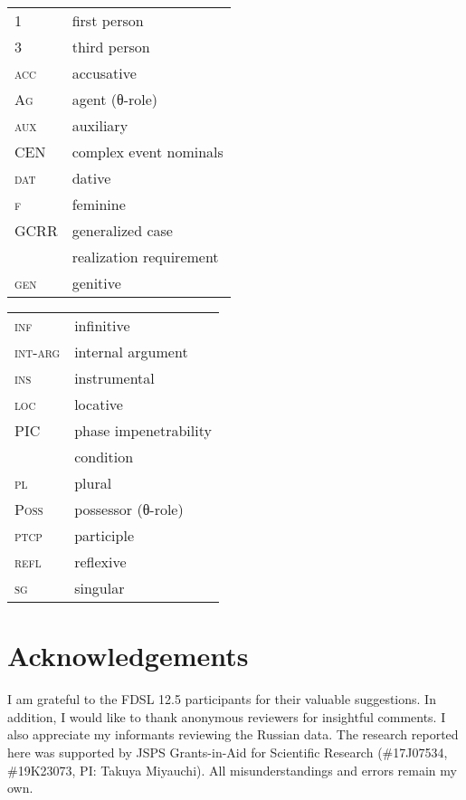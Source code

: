 \documentclass[output=paper,
]{langscibook}
\begin{document}
\begin{tabularx}{.5\textwidth}{lX}
1 & first person \\ 
3 & third person\\
\textsc{acc} & accusative \\ 
\textsc{Ag} & agent (θ-role) \\ 
\textsc{aux} & auxiliary \\ 
CEN & complex event nominals \\
\textsc{dat} & dative \\ 
\textsc{f} & feminine \\ 
GCRR & generalized case \\
 &realization requirement \\
\textsc{gen} & genitive  \\ 
\end{tabularx}
\begin{tabularx}{.45\textwidth}{lX}
\textsc{inf} & infinitive \\ 
\textsc{int-arg} & internal argument \\ 
\textsc{ins} & instrumental \\ 
\textsc{loc} & locative  \\ 
PIC & phase impenetrability\\
&condition \\
\textsc{pl} & plural \\ 
\textsc{Poss} & possessor (θ-role) \\ 
\textsc{ptcp} & participle \\ 
\textsc{refl}&reflexive \\ 
\textsc{sg} & singular \\ 
\end{tabularx}



\section*{Acknowledgements}
	I am grateful to the FDSL 12.5 participants for their valuable suggestions. In addition, I would like to thank anonymous reviewers for insightful comments. I also appreciate my informants reviewing the Russian data. The research reported here was supported by JSPS Grants-in-Aid for Scientific Research (\#17J07534, \#19K23073, PI: Takuya Miyauchi). All misunderstandings and errors remain my own.
		
\sloppy
\printbibliography[heading=subbibliography,notkeyword=this]
\end{document}
